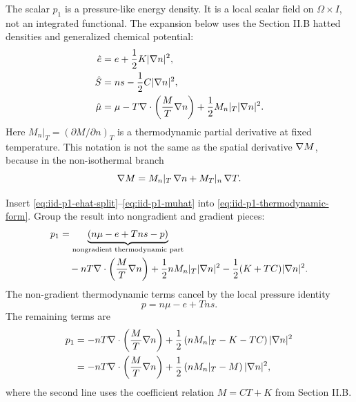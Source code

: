 The scalar \(p_1\) is a pressure-like energy density.  It is a local scalar
field on \(\Omega\times I\), not an integrated functional.  The expansion below
uses the Section II.B hatted densities and generalized chemical potential:
\begin{align}
  \hat e
  &=
  e+\frac{1}{2}K|\nabla n|^2,
  \label{eq:iid-p1-ehat-split}\\
  \hat S
  &=
  ns-\frac{1}{2}C|\nabla n|^2,
  \label{eq:iid-p1-shat-split}\\
  \hat\mu
  &=
  \mu
  -
  T\nabla\cdot\left(\frac{M}{T}\nabla n\right)
  +
  \frac{1}{2}M_n|_T|\nabla n|^2.
  \label{eq:iid-p1-muhat}
\end{align}
Here \(M_n|_T=(\partial M/\partial n)_T\) is a thermodynamic partial
derivative at fixed temperature.  This notation is not the same as the spatial
derivative \(\nabla M\), because in the non-isothermal branch
\[
  \nabla M
  =
  M_n|_T\,\nabla n
  +
  M_T|_n\,\nabla T .
\]

Insert \eqref{eq:iid-p1-ehat-split}--\eqref{eq:iid-p1-muhat} into
\eqref{eq:iid-p1-thermodynamic-form}.  Group the result into nongradient and
gradient pieces:
\begin{align}
  p_1
  &=\underbrace{(n\mu-e+Tns-p)}_{\text{nongradient thermodynamic part}}
  \\
  &\quad
  -nT\nabla\cdot\left(\frac{M}{T}\nabla n\right)
  +\frac12 nM_n|_T|\nabla n|^2
  -\frac12(K+TC)|\nabla n|^2.
  \label{eq:iid-p1-substitution-ledger}
\end{align}
The non-gradient thermodynamic terms
cancel by the local pressure identity
\begin{equation}
  p=n\mu-e+Tns .
  \label{eq:iid-p-local-identity}
\end{equation}
The remaining terms are
\begin{align}
  p_1
  &=
  -nT\nabla\cdot\left(\frac{M}{T}\nabla n\right)
  +
  \frac{1}{2}\left(nM_n|_T-K-TC\right)|\nabla n|^2
  \nonumber\\
  &=
  -nT\nabla\cdot\left(\frac{M}{T}\nabla n\right)
  +
  \frac{1}{2}\left(nM_n|_T-M\right)|\nabla n|^2,
  \label{eq:iid-p1-pre-divergence-expanded}
\end{align}
where the second line uses the coefficient relation \(M=CT+K\) from
Section II.B.

